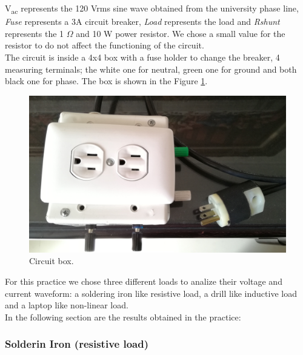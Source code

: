 \documentclass[journal]{IEEEtran}
\begin{document}
V\textsubscript{ac} represents the 120 Vrms sine wave obtained from 
the university phase line, \textit{Fuse} represents a 3A circuit 
breaker, \textit{Load} represents the load and \textit{Rshunt} 
represents the 1 $\Omega$ and 10 W 
power resistor. We chose a small value for the resistor to do not 
affect the functioning of the circuit. \\

The circuit is inside a 4x4 box with a fuse holder to change the 
breaker, 4 measuring terminals; the white one for neutral, green one 
for ground and  both black one for phase. The box is shown in the 
Figure \ref{circuit_box}. \\

\begin{figure}[h]
\centering
\includegraphics[clip,width=0.8\columnwidth]{circuit_box.png}
\caption{Circuit box.}
\label{circuit_box}
\end{figure}

For this practice we chose three different loads to analize their 
voltage and current waveform: a soldering iron 
like resistive load, a drill like inductive load and a laptop 
like non-linear load. \\

In the following section are the results obtained in the practice: \\

\subsubsection{Solderin Iron (resistive load)}
\end{document}
